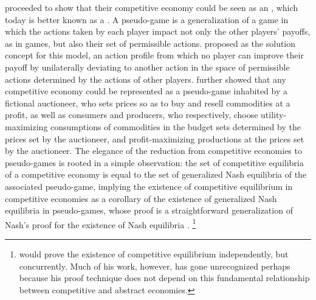\citeauthor{arrow-debreu} proceeded to show that their competitive economy could be seen as an , which today is better known as a  \cite{arrow-debreu, facchinei2010generalized}.
A pseudo-game is a generalization of a game in which the actions taken by each player impact not only the other players' payoffs, as in games, but also their set of permissible actions.
\citeauthor{arrow-debreu} proposed  as the solution concept for this model, an action profile from which no player can improve their payoff by unilaterally deviating to another action in the space of permissible actions determined by the actions of other players.
\citeauthor{arrow-debreu} further showed that any competitive economy could be represented as a pseudo-game inhabited by a fictional auctioneer, who sets prices so as to buy and resell commodities at a profit, as well as consumers and producers, who respectively, choose utility-maximizing consumptions of commodities in the budget sets determined by the prices set by the auctioneer, and profit-maximizing productions at the prices set by the auctioneer.
The elegance of the reduction from competitive economies to pseudo-games is rooted in a simple observation: the set of competitive equilibria of a competitive economy is equal to the set of generalized Nash equilibria of the associated pseudo-game, implying the existence of competitive equilibrium in competitive economies as a corollary of the existence of generalized Nash equilibria in pseudo-games, whose proof is a straightforward generalization of Nash's proof for the existence of Nash equilibria \cite{nash1950existence}.%
\footnote{\citet{mckenzie1959existence} would prove the existence of competitive equilibrium independently, but concurrently.
Much of his work, however, has gone unrecognized perhaps because his proof technique does not depend on this fundamental relationship between competitive and abstract economies.}

